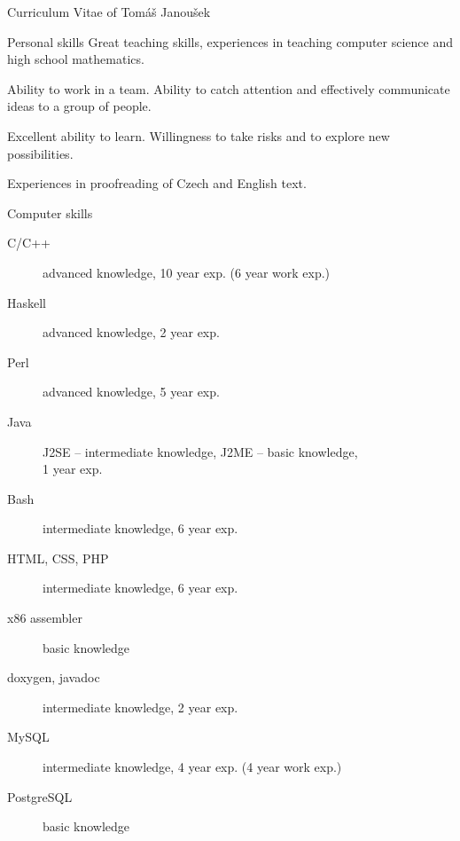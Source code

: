 \documentclass[12pt,a4paper,english,pdftex]{article}
\begin{document}
\begin{cv}{Curriculum Vitae of Tomáš Janoušek}
\begin{cvlist}{Personal skills}
	Great teaching skills, experiences in teaching computer science and
	high school mathematics.

	\item[Organisational skills] Ability to work in a team. Ability to
	catch attention and effectively communicate ideas to a group of
	people.

	\item[Other skills] Excellent ability to learn. Willingness to take
	risks and to explore new possibilities.

	Experiences in proofreading of Czech and English text.
    \end{cvlist}

    \goodbreak
    \begin{cvlist}{Computer skills}
        \item[Programming]
            \begin{description}
                \item[C/C++] advanced knowledge, 10 year exp. (6 year
                work exp.)
                \item[Haskell] advanced knowledge, 2 year exp.
                \item[Perl] advanced knowledge, 5 year exp.
                \item[Java] J2SE -- intermediate knowledge, J2ME -- basic
                knowledge, \\ 1 year exp.
                \item[Bash] intermediate knowledge, 6 year exp.
                \item[HTML, CSS, PHP] intermediate knowledge, 6 year exp.
                \item[x86 assembler] basic knowledge
                \item[doxygen, javadoc] intermediate knowledge, 2 year exp.
            \end{description}

	\goodbreak
        \item[Database]
            \begin{description}
                \item[MySQL] intermediate knowledge, 4 year exp. (4 year work
                exp.)
                \item[PostgreSQL] basic knowledge
            \end{description}


\end{cvlist}
\end{cv}
\end{document}
